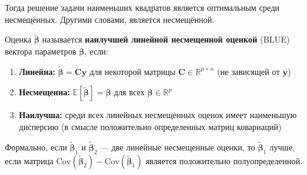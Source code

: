 Тогда решение задачи наименьших квадратов является оптимальным среди несмещённых.
Другими словами, является несмещённой.

\begin{definition}
    Оценка $\tilde{\bm{\beta}}$ называется \textbf{наилучшей линейной несмещенной оценкой} (BLUE) вектора параметров
    $\bm{\beta}$, если:
    \begin{enumerate}
        \item \textbf{Линейна:} $\tilde{\bm{\beta}} = \bm{C}\bm{y}$ для некоторой матрицы $\bm{C} \in
        \mathbb{R}^{p \times n}$ (не зависящей от $\bm{y}$)
        \item \textbf{Несмещенна:} $\mathbb{E}[\tilde{\bm{\beta}}] = \bm{\beta}$ для всех $\bm{\beta} \in
        \mathbb{R}^p$
        \item \textbf{Наилучша:} среди всех линейных несмещенных оценок имеет наименьшую дисперсию (в смысле
        положительно определенных матриц ковариаций)
    \end{enumerate}
\end{definition}

Формально, если $\tilde{\bm{\beta}}_1$ и $\tilde{\bm{\beta}}_2$ --- две линейные несмещенные оценки, то
$\tilde{\bm{\beta}}_1$ лучше, если матрица $\text{Cov}(\tilde{\bm{\beta}}_2) - \text{Cov}(\tilde{\bm{\beta}}_1)$
является положительно полуопределенной.